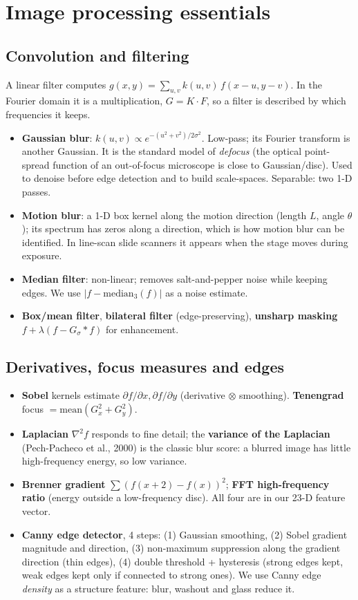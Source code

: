 \section{Image processing essentials}
\subsection{Convolution and filtering}
A linear filter computes $g(x,y)=\sum_{u,v} k(u,v)\,f(x-u,y-v)$. In the Fourier domain it is a multiplication,
$G=K\cdot F$, so a filter is described by which frequencies it keeps.
\begin{itemize}
\item \textbf{Gaussian blur}: $k(u,v)\propto e^{-(u^2+v^2)/2\sigma^2}$. Low-pass; its Fourier transform is another
Gaussian. It is the standard model of \emph{defocus} (the optical point-spread function of an out-of-focus microscope is
close to Gaussian/disc). Used to denoise before edge detection and to build scale-spaces. Separable: two 1-D passes.
\item \textbf{Motion blur}: a 1-D box kernel along the motion direction (length $L$, angle $\theta$); its spectrum has
zeros along a direction, which is how motion blur can be identified. In line-scan slide scanners it appears when the
stage moves during exposure.
\item \textbf{Median filter}: non-linear; removes salt-and-pepper noise while keeping edges. We use
$|f-\mathrm{median}_3(f)|$ as a noise estimate.
\item \textbf{Box/mean filter}, \textbf{bilateral filter} (edge-preserving), \textbf{unsharp masking}
$f+\lambda(f-G_\sigma*f)$ for enhancement.
\end{itemize}

\subsection{Derivatives, focus measures and edges}
\begin{itemize}
\item \textbf{Sobel} kernels estimate $\partial f/\partial x,\partial f/\partial y$ (derivative $\otimes$ smoothing).
\textbf{Tenengrad} focus $=\mathrm{mean}(G_x^2+G_y^2)$.
\item \textbf{Laplacian} $\nabla^2 f$ responds to fine detail; the \textbf{variance of the Laplacian}
(Pech-Pacheco et al., 2000) is the classic blur score: a blurred image has little high-frequency energy, so low variance.
\item \textbf{Brenner gradient} $\sum (f(x+2)-f(x))^2$; \textbf{FFT high-frequency ratio} (energy outside a low-frequency
disc). All four are in our 23-D feature vector.
\item \textbf{Canny edge detector}, 4 steps: (1) Gaussian smoothing, (2) Sobel gradient magnitude and direction,
(3) non-maximum suppression along the gradient direction (thin edges), (4) double threshold + hysteresis (strong edges
kept, weak edges kept only if connected to strong ones). We use Canny edge \emph{density} as a structure feature:
blur, washout and glass reduce it.
\end{itemize}

